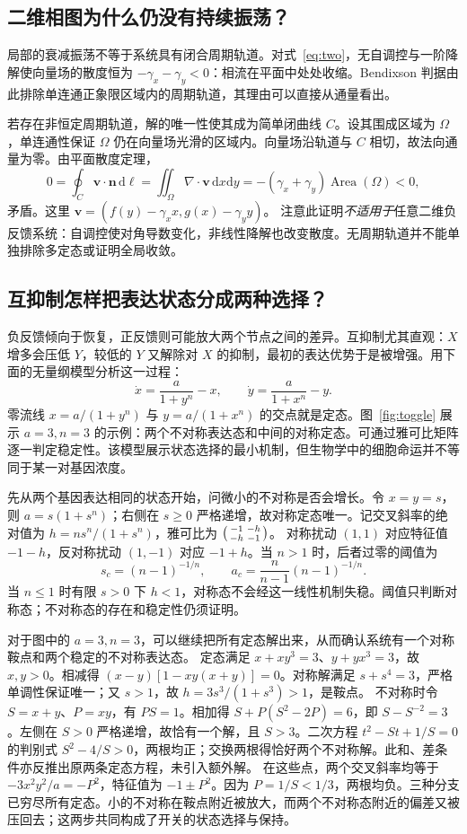 \documentclass[11pt,a4paper,UTF8,fontset=fandol]{ctexart}
\newcommand{\dd}{\mathrm d}\newcommand{\R}{\mathbb R}\newcommand{\ssv}{\mathrm{ss}}
\begin{document}
\subsection{二维相图为什么仍没有持续振荡？}
局部的衰减振荡不等于系统具有闭合周期轨道。对式~\eqref{eq:two}，无自调控与一阶降解使向量场的散度恒为 $-\gamma_x-\gamma_y<0$：相流在平面中处处收缩。Bendixson 判据由此排除单连通正象限区域内的周期轨道，其理由可以直接从通量看出。

若存在非恒定周期轨道，解的唯一性使其成为简单闭曲线 $C$。设其围成区域为 $\Omega$，单连通性保证 $\Omega$ 仍在向量场光滑的区域内。向量场沿轨道与 $C$ 相切，故法向通量为零。由平面散度定理，
\[
0=\oint_C\bm v\cdot\bm n\,\dd\ell
=\iint_\Omega\nabla\cdot\bm v\,\dd x\dd y
=-(\gamma_x+\gamma_y)\operatorname{Area}(\Omega)<0,
\]
矛盾。这里 $\bm v=(f(y)-\gamma_xx,g(x)-\gamma_yy)$。
注意此证明\emph{不适用于}任意二维负反馈系统：自调控使对角导数变化，非线性降解也改变散度。无周期轨道并不能单独排除多定态或证明全局收敛。

\subsection{互抑制怎样把表达状态分成两种选择？}
负反馈倾向于恢复，正反馈则可能放大两个节点之间的差异。互抑制尤其直观：$X$ 增多会压低 $Y$，较低的 $Y$ 又解除对 $X$ 的抑制，最初的表达优势于是被增强。用下面的无量纲模型分析这一过程：
\begin{equation}\dot x=\frac{a}{1+y^n}-x,\qquad\dot y=\frac{a}{1+x^n}-y.\label{eq:toggle}\end{equation}
零流线 $x=a/(1+y^n)$ 与 $y=a/(1+x^n)$ 的交点就是定态。图~\ref{fig:toggle} 展示 $a=3,n=3$ 的示例：两个不对称表达态和中间的对称定态。可通过雅可比矩阵逐一判定稳定性。该模型展示状态选择的最小机制，但生物学中的细胞命运并不等同于某一对基因浓度。

先从两个基因表达相同的状态开始，问微小的不对称是否会增长。令 $x=y=s$，则 $a=s(1+s^n)$；右侧在 $s\geq0$ 严格递增，故对称定态唯一。记交叉斜率的绝对值为
$h=ns^n/(1+s^n)$，雅可比为 $\begin{psmallmatrix}-1&-h\\-h&-1\end{psmallmatrix}$。
对称扰动 $(1,1)$ 对应特征值 $-1-h$，反对称扰动 $(1,-1)$ 对应 $-1+h$。当 $n>1$ 时，后者过零的阈值为
\[
s_c=(n-1)^{-1/n},\qquad a_c=\frac n{n-1}(n-1)^{-1/n}.
\]
当 $n\leq1$ 时有限 $s>0$ 下 $h<1$，对称态不会经这一线性机制失稳。阈值只判断对称态；不对称态的存在和稳定性仍须证明。

对于图中的 $a=3,n=3$，可以继续把所有定态解出来，从而确认系统有一个对称鞍点和两个稳定的不对称表达态。
定态满足 $x+xy^3=3$、$y+yx^3=3$，故 $x,y>0$。相减得
$(x-y)[1-xy(x+y)]=0$。对称解满足 $s+s^4=3$，严格单调性保证唯一；又 $s>1$，故 $h=3s^3/(1+s^3)>1$，是鞍点。
不对称时令 $S=x+y$、$P=xy$，有 $PS=1$。相加得
$S+P(S^2-2P)=6$，即 $S-S^{-2}=3$。左侧在 $S>0$ 严格递增，故恰有一个解，且 $S>3$。二次方程 $t^2-St+1/S=0$ 的判别式 $S^2-4/S>0$，两根均正；交换两根得恰好两个不对称解。此和、差条件亦反推出原两条定态方程，未引入额外解。
在这些点，两个交叉斜率均等于 $-3x^2y^2/a=-P^2$，特征值为 $-1\pm P^2$。因为 $P=1/S<1/3$，两根均负。三种分支已穷尽所有定态。小的不对称在鞍点附近被放大，而两个不对称态附近的偏差又被压回去；这两步共同构成了开关的状态选择与保持。
\end{document}
